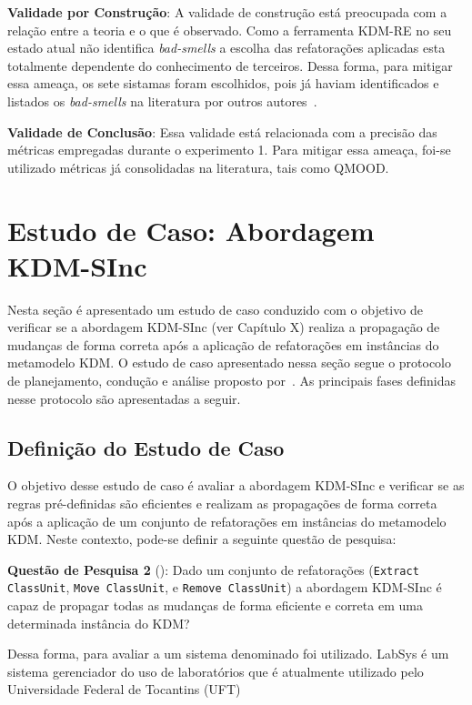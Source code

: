 \textbf{Validade por Construção}: A validade de construção está preocupada com a relação entre a teoria e o que é observado. Como a ferramenta KDM-RE no seu estado atual não identifica \textit{bad-smells} a escolha das refatorações aplicadas esta totalmente dependente do conhecimento de terceiros. Dessa forma, para mitigar essa ameaça, os sete sistamas foram escolhidos, pois já haviam identificados e listados os \textit{bad-smells} na literatura por outros autores~\cite{Kessentini_2011, Ouni_2013, Moha_2010, Kessentini_2010}.

\textbf{Validade de Conclusão}: Essa validade está relacionada com a precisão das métricas empregadas durante o experimento 1. Para mitigar essa ameaça, foi-se utilizado métricas já consolidadas na literatura, tais como QMOOD. 


\section{Estudo de Caso: Abordagem KDM-SInc}\label{sec:experimento_KDM_SINc}



Nesta seção é apresentado um estudo de caso conduzido com o objetivo de verificar se a abordagem KDM-SInc (ver Capítulo X) realiza a propagação de mudanças de forma correta após a aplicação de refatorações em instâncias do metamodelo KDM. O estudo de caso apresentado nessa seção segue o protocolo de planejamento, condução e análise proposto por~. As principais fases definidas nesse protocolo são apresentadas a seguir.

\subsection{Definição do Estudo de Caso}

O objetivo desse estudo de caso é avaliar a abordagem KDM-SInc e verificar se as regras pré-definidas são eficientes e realizam as propagações de forma correta após a aplicação de um conjunto de refatorações em instâncias do metamodelo KDM. Neste contexto, pode-se definir a seguinte questão de pesquisa:

\textbf{Questão de Pesquisa 2} (): Dado um conjunto de refatorações (\texttt{Extract ClassUnit}, \texttt{Move ClassUnit}, e \texttt{Remove ClassUnit}) a abordagem KDM-SInc é capaz de propagar todas as mudanças de forma eficiente e correta em uma determinada instância do KDM?

Dessa forma, para avaliar a  um sistema denominado  foi utilizado. LabSys é um sistema gerenciador do uso de laboratórios que é atualmente utilizado pelo Universidade Federal de Tocantins (UFT)

